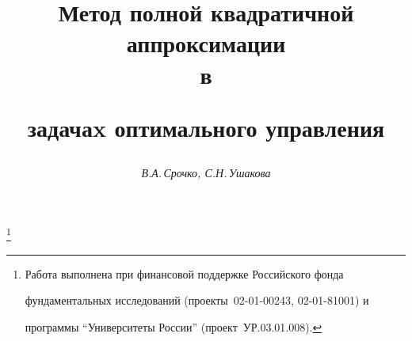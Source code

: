 









\newcommand{\sign}{\operatorname{sign}}


\newcommand{\tts}[1]{}







\setcounter{page}{87}

















\author{\it В.А.\,Срочко, С.Н.\,Ушакова}




\title{Метод полной квадратичной аппроксимации\\ в


задачаx оптимального управления}


\thanks{Работа выполнена при финансовой поддержке Российского фонда


фундаментальных исследований (проекты \No\No\,02-01-00243, 02-01-81001) и 


программы ``Университеты России'' (проект \No\,УР.03.01.008).}





\date{}




\pagestyle{plain} %





